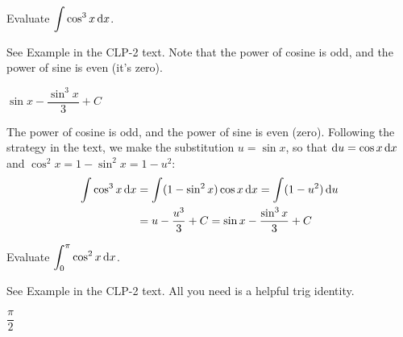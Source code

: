 \subsection*{\Procedural}


\begin{question}[M105 2015A]\label{1.8sincos1}
Evaluate $\displaystyle\int\cos^3x\,\mathrm{d}x$.
\end{question}

\begin{hint}
See Example  in the
CLP-2 text. Note that the power of cosine is odd, and the power of sine is even (it's zero).
\end{hint}

\begin{answer}
$ \sin x-\dfrac{\sin^3 x}{3} +C$
\end{answer}

\begin{solution}
The power of cosine is odd, and the power of sine is even (zero).  Following the strategy in the text, we make the substitution $u=\sin x$, so that $\mathrm{d}u=\cos x\,\mathrm{d}x$
and $\cos^2 x = 1-\sin^2 x = 1-u^2$:
\begin{align*}
\int \cos^3x\,\mathrm{d}x
&=\int (1-\sin^2x)\cos x\,\mathrm{d}x
=\int (1-u^2)\,\mathrm{d}u\\
&=u-\frac{u^3}3+C
=\sin x-\frac{\sin^3 x}{3}+C
\end{align*}
\end{solution}


\begin{Mquestion}[2014D]
Evaluate $\displaystyle\int_0^\pi\cos^2x\,\mathrm{d}x$.
\end{Mquestion}

\begin{hint}
See Example  in the
CLP-2 text. All you need is a helpful trig identity.
\end{hint}

\begin{answer}
$\dfrac{\pi}{2}$
\end{answer}

